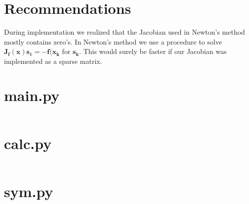 \documentclass{article}
\newcommand{\vect}[1]{\boldsymbol{#1}}
\begin{document}
\section{Recommendations}
During implementation we realized that the Jacobian used in Newton's method mostly contains zero's. In Newton's method we use a procedure to solve $\vect{J_f}(\vect{x}) \vect{s}_k = -\vect{f}(\vect{x_k}$ for $\vect{s_k}$. This would surely be faster if our Jacobian was implemented as a sparse matrix.

\clearpage
\begin{appendices}
\section{main.py}
\label{app:main}
\inputminted{python}{src/main.py}
\section{calc.py}
\label{app:calc}
\inputminted{python}{src/calc.py}
\section{sym.py}
\label{app:sym}
\inputminted{python}{src/sym.py}
\end{appendices}



\end{document}
